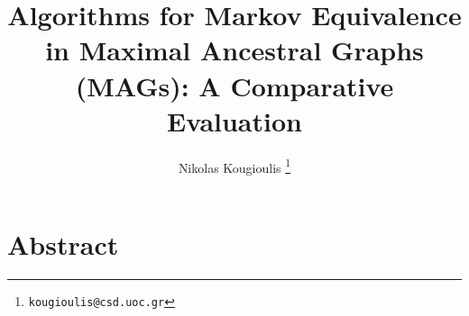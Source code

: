 \documentclass[a4paper]{article}
\begin{document}
	
	
	\title{Algorithms for Markov Equivalence in Maximal Ancestral Graphs (MAGs): A Comparative Evaluation}
	
	\author{Nikolas Kougioulis%
		\thanks{\texttt{kougioulis@csd.uoc.gr}}}
	\date{}
	
	\maketitle
	
	\section*{Abstract}
	
\end{document}
